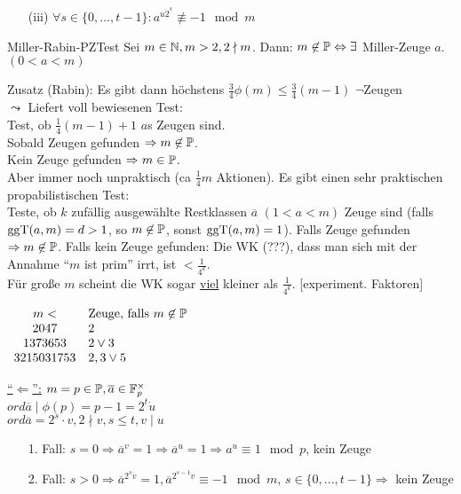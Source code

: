 \documentclass[a4paper,DIV15,BCOR12mm]{article}
\begin{document}
\begin{itemize}
\begin{definition}
\begin{itemize}
    \item[(iii)] $\forall s \in \{0,...,t-1\}: a^{u\dot 2^s} \not\equiv -1 \mod m$
   \end{itemize}
  \end{definition}
  \begin{satz}{Miller-Rabin-PZTest}
   Sei $m \in \mathbb{N}, m > 2, 2 \nmid m$. Dann: $m \not\in \mathbb{P} \Leftrightarrow \exists$ Miller-Zeuge $a$. $(0 < a < m)$
  \end{satz}
  Zusatz (Rabin): Es gibt dann höchstens $\frac{3}{4}\phi(m) \le \frac{3}{4}(m-1)$ $\neg$Zeugen\\
  $\leadsto$ Liefert voll bewiesenen Test:\\
  Test, ob $\frac{1}{4}(m-1)+1$ $a$s Zeugen sind.\\
  Sobald Zeugen gefunden $\Rightarrow m \not\in \mathbb{P}$.\\
  Kein Zeuge gefunden $\Rightarrow m \in \mathbb{P}$.\\
  Aber immer noch unpraktisch (ca $\frac{1}{4}m$ Aktionen). Es gibt einen sehr praktischen propabilistischen Test:\\
  Teste, ob $k$ zufällig ausgewählte Restklassen $\overline a$ $(1 < a < m)$ Zeuge sind (falls $\mathop{\rm ggT}\nolimits (a,m) = d > 1$, so $m \not\in \mathbb{P}$, sonst $\mathop{\rm ggT}\nolimits (a,m) = 1$). Falls Zeuge gefunden $\Rightarrow m \not\in \mathbb{P}$. Falls kein Zeuge gefunden: Die WK (???), dass man sich mit der Annahme "`$m$ ist prim"' irrt, ist $< \frac{1}{4^k}$.\\
  Für große $m$ scheint die WK sogar \underline{viel} kleiner als $\frac{1}{4^k}$. [experiment. Faktoren]
  
  $\begin{array}{cl}
   m < & \text{Zeuge, falls } m \not\in \mathbb{P} \\
   2047 & 2 \\
   1373653 & 2 \vee 3 \\
   3215031753 & 2,3 \vee 5
  \end{array}$
  \begin{beweis}
   \item[\underline{"`$\Leftarrow$"':}] $m = p \in \mathbb{P}, \overline a \in \mathbb{F}_p^\times$\\
    $ord \overline a \mid \phi(p) = p-1 = 2^t \dot u$\\
    $ord \overline a = 2^s \cdot v, 2 \nmid v, s \le t, v \mid u$
    \begin{itemize}
     \item[1. Fall:] $s = 0 \Rightarrow \overline a^v = 1 \Rightarrow \overline a^u = 1 \Rightarrow a^u \equiv 1 \mod p$, kein Zeuge
     \item[2. Fall:] $s > 0 \Rightarrow \overline a^{2^s \dot v} = 1, \overline a^{2^{s-1}\dot v} \equiv -1 \mod m$, $s \in \{0,...,t-1\} \Rightarrow$ kein Zeuge
    \end{itemize}
  \end{beweis}
\end{itemize}
\end{document}
